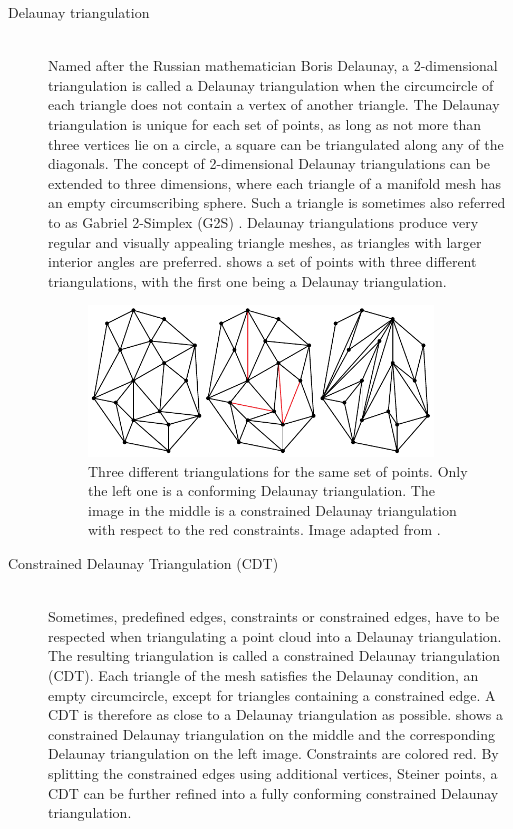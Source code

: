 \begin{description}


	\item[Delaunay triangulation] \hfill \\
	Named after the Russian mathematician Boris Delaunay, a 2-dimensional triangulation is called a Delaunay triangulation when the circumcircle of each triangle does not contain a vertex of another triangle.
	The Delaunay triangulation is unique for each set of points, as long as not more than three vertices lie on a circle, \eg a square can be triangulated along any of the diagonals.
	The concept of 2-dimensional Delaunay triangulations can be extended to three dimensions, where each triangle of a manifold mesh has an empty circumscribing sphere.
	Such a triangle is sometimes also referred to as Gabriel 2-Simplex (G2S) \cite{g2s}.
	Delaunay triangulations produce very regular and visually appealing triangle meshes, as triangles with larger interior angles are preferred.
	 shows a set of points with three different triangulations, with the first one being a Delaunay triangulation.

	\begin{figure}[H]
		\centering
		\includegraphics[width=0.9\textwidth]{images/delaunay_triangulation}
		\caption[Delaunay triangulations]{
			Three different triangulations for the same set of points.
			Only the left one is a conforming Delaunay triangulation.
			The image in the middle is a constrained Delaunay triangulation with respect to the red constraints.
			Image adapted from \cite{delaunay_image}.
		}
		\label{fig:delaunay_triangulation}
	\end{figure}


	\item[Constrained Delaunay Triangulation (CDT)] \hfill \\
	Sometimes, predefined edges, \ie constraints or constrained edges, have to be respected when triangulating a point cloud into a Delaunay triangulation.
	The resulting triangulation is called a constrained Delaunay triangulation (CDT).
	Each triangle of the mesh satisfies the Delaunay condition, \ie an empty circumcircle, except for triangles containing a constrained edge.
	A CDT is therefore as close to a Delaunay triangulation as possible.
	 shows a constrained Delaunay triangulation on the middle and the corresponding Delaunay triangulation on the left image.
	Constraints are colored red.
	By splitting the constrained edges using additional vertices, \ie Steiner points, a CDT can be further refined into a fully conforming constrained Delaunay triangulation.



\end{description}
